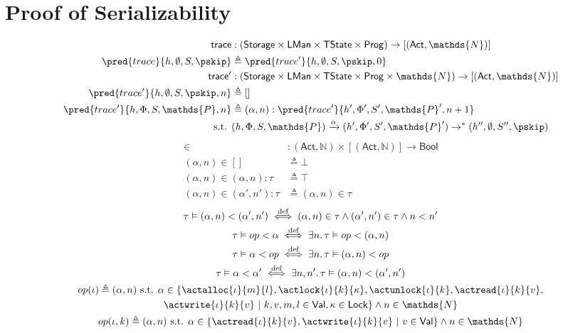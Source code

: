 \section{Proof of Serializability}

\begin{align*}
\mathsf{trace} &: (\mathsf{Storage} \times \mathsf{LMan} \times \mathsf{TState} \times \mathsf{Prog}) \rightarrow [(\mathsf{Act}, \mathds{N})] \\
\pred{trace}{h, \emptyset, S, \pskip} &\triangleq \pred{trace'}{h, \emptyset, S, \pskip, 0} \\
\mathsf{trace'} &: (\mathsf{Storage} \times \mathsf{LMan} \times \mathsf{TState} \times \mathsf{Prog} \times \mathds{N}) \rightarrow [(\mathsf{Act}, \mathds{N})] \\
\pred{trace'}{h, \emptyset, S, \pskip, n} &\triangleq [] \\
\pred{trace'}{h, \Phi, S, \mathds{P}, n} &\triangleq (\alpha, n) : \pred{trace'}{h', \Phi', S', \mathds{P}', n+ 1}
\\
\text{s.t. }& (h, \Phi, S, \mathds{P}) \xrightarrow{\alpha} (h', \Phi', S', \mathds{P}') \rightarrow^* (h'', \emptyset, S'', \pskip)
\end{align*}
\begin{align*}
\in &: (\mathsf{Act}, \mathds{N}) \times [(\mathsf{Act}, \mathds{N})] \rightarrow \mathsf{Bool} \\
(\alpha, n) \in [] &\triangleq \bot \\
(\alpha, n) \in (\alpha, n):\tau &\triangleq \top \\
(\alpha, n) \in (\alpha', n'):\tau &\triangleq (\alpha, n) \in \tau
\end{align*}
\begin{gather*}
\tau \vDash (\alpha, n) < (\alpha', n') \overset{\text{def}}{\iff}
(\alpha, n) \in \tau \land (\alpha', n') \in \tau \land n < n'
\\
\tau \vDash op < \alpha \overset{\text{def}}{\iff}
\exists n \ldotp \tau \vDash op < (\alpha, n)
\\
\tau \vDash \alpha < op \overset{\text{def}}{\iff}
\exists n \ldotp \tau \vDash (\alpha, n) < op
\\
\tau \vDash \alpha < \alpha' \overset{\text{def}}{\iff}
\exists n, n' \ldotp \tau \vDash (\alpha, n) < (\alpha', n')
\\
op(\iota) \triangleq (\alpha, n) \text{ s.t. } \alpha \in \{ \actalloc{\iota}{m}{l}, \actlock{\iota}{k}{\kappa}, \actunlock{\iota}{k}, \actread{\iota}{k}{v}, \\ \actwrite{\iota}{k}{v}\ |\ k, v, m, l \in \mathsf{Val}, \kappa \in \mathsf{Lock} \} \land n \in \mathds{N}
\\
op(\iota, k) \triangleq (\alpha, n) \text{ s.t. } \alpha \in \{ \actread{\iota}{k}{v}, \actwrite{\iota}{k}{v}\ |\ v \in \mathsf{Val} \} \land n \in \mathds{N}
\end{gather*}
